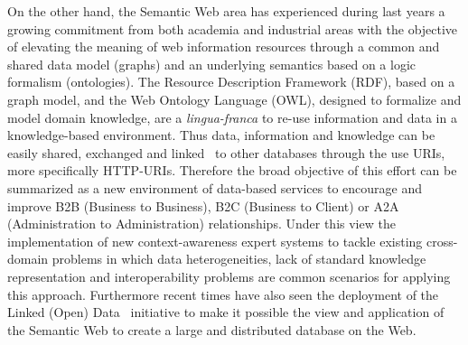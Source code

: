 On the other hand, the Semantic Web area has experienced during last years a growing commitment from both academia and industrial areas 
with the objective of elevating the meaning of web information resources through a common and shared data model (graphs) and 
an underlying semantics based on a logic formalism (ontologies). The Resource Description Framework (RDF), based on a graph model, 
and the Web Ontology Language (OWL), designed to formalize and model domain knowledge, are a \textit{lingua-franca} to re-use information 
and data in a knowledge-based environment. Thus data, information and knowledge can be easily shared, exchanged and linked~\cite{Maali_Cyganiak_2011} 
to other databases through the use URIs, more specifically HTTP-URIs. Therefore the broad objective of this effort can 
be summarized as a new environment of data-based services to encourage and improve B2B (Business to Business), B2C (Business to Client) or 
A2A (Administration to Administration) relationships. Under this view the implementation of new context-awareness expert systems 
to tackle existing cross-domain problems in which data heterogeneities, lack of standard knowledge representation and 
interoperability problems are common scenarios for applying this approach. Furthermore recent times have also seen the deployment of 
the Linked (Open) Data~\cite{Berners-Lee-2006,Heath_Bizer_2011} initiative  to make it possible the view and application of the Semantic Web to create a large and distributed database on the Web. 


